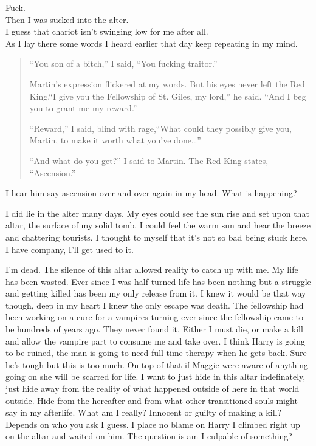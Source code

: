 Fuck.\\

Then I was sucked into the alter.\\

I guess that chariot isn't swinging low for me after all.\\

As I lay there some words I heard earlier that day keep repeating in my mind.
\begin{quotation}
	``You son of a bitch,'' I said, ``You fucking traitor.''
	
	Martin’s expression flickered at my words. But his eyes never left the Red King.``I give you the Fellowship of St. Giles, my lord,'' he said. ``And I beg you to grant me my reward.''
	
	``Reward,'' I said, blind with rage,``What could they possibly give you, Martin, to make it worth what you’ve done\dots''

	``And what do you get?'' I said to Martin.
	The Red King states, ``Ascension.''
\end{quotation}

I hear him say ascension over and over again in my head. What is happening? 

I did lie in the alter many days. My eyes could see the sun rise and set upon that altar, the surface of my solid tomb. I could feel the warm sun and hear the breeze and chattering tourists. I thought to myself that it's not so bad being stuck here. I have company, I'll get used to it.

I'm dead. The silence of this altar allowed reality to catch up with me. My life has been wasted. Ever since I was half turned life has been nothing but a struggle and getting killed has been my only release from it. I knew it would be that way though, deep in my heart I knew the only escape was death. The fellowship had been working on a cure for a vampires turning ever since the fellowship came to be hundreds of years ago. They never found it. Either I must die, or make a kill and allow the vampire part to consume me and take over. I think Harry is going to be ruined, the man is going to need full time therapy when he gets back. Sure he's tough but this is too much. On top of that if Maggie were aware of anything going on she will be scarred for life. I want to just hide in this altar indefinately, just hide away from the reality of what happened outside of here in that world outside. Hide from the hereafter and from what other transitioned souls might say in my afterlife. What am I really? Innocent or guilty of making a kill? Depends on who you ask I guess. I place no blame on Harry I climbed right up on the altar and waited on him. The question is am I culpable of something?

